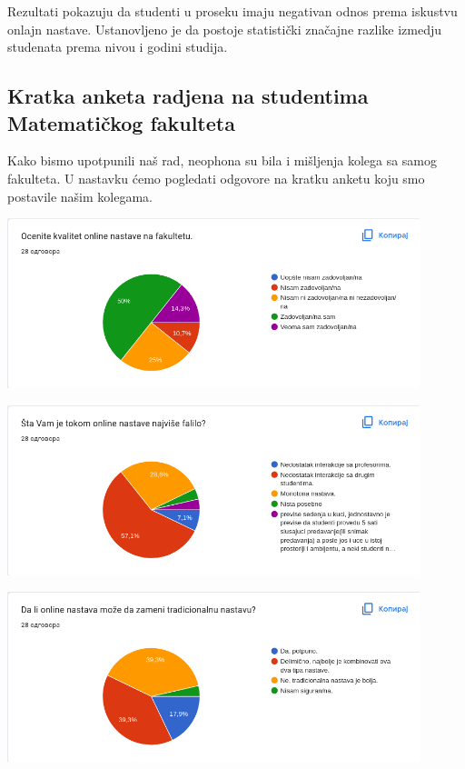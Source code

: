 \documentclass{article}
\begin{document}
Rezultati pokazuju da studenti u proseku imaju negativan odnos prema iskustvu onlajn nastave. Ustanovljeno je da postoje statistički značajne razlike izmedju studenata prema nivou i godini studija.

\subsection{Kratka anketa radjena na studentima Matematičkog fakulteta}

Kako bismo upotpunili naš rad, neophona su bila i mišljenja kolega sa samog fakulteta. U nastavku ćemo pogledati odgovore na kratku anketu koju smo postavile našim kolegama.

\begin{center}
    \includegraphics[width=12cm]{1.png}
\end{center}

\begin{center}
    \includegraphics[width=12cm]{2.png}
\end{center}

\begin{center}
    \includegraphics[width=12cm]{3.png}
\end{center}
\end{document}

